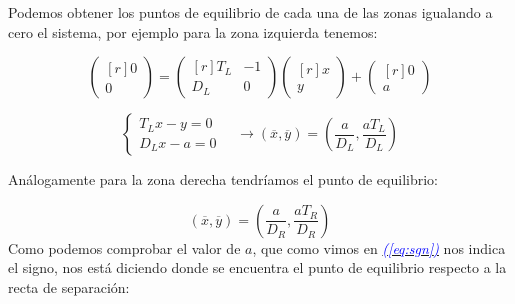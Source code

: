 \documentclass[12pt,a4paper]{report} %
\newcommand{\eref}[1]{\hyperref[#1]{\textcolor{blue}{\textit{(\ref*{#1})}}}}
\begin{document}
		\vspace{0.5cm}Podemos obtener los puntos de equilibrio de cada una de las zonas igualando a cero el sistema, por ejemplo para la zona izquierda tenemos:
		\label{borrar}
		
		\begin{equation*}
			\begin{pmatrix*}[r]
				0\\ 0
			\end{pmatrix*}= \begin{pmatrix*}[r]
				T_L & -1 \\ D_L & 0
			\end{pmatrix*} \begin{pmatrix*}[r]
				x \\ y
			\end{pmatrix*}+\begin{pmatrix*}[r]
				0 \\ a
			\end{pmatrix*}
		\end{equation*}\smallskip
		
		\begin{equation}
			\label{eq:eqpointL}
			\left\{
			\begin{aligned}
				T_Lx-y=0\\
				D_Lx-a=0
			\end{aligned}
			\right. \quad \longrightarrow \left( \overline{x},\overline{y} \right)=\left( \frac{a}{D_L},\frac{aT_L}{D_L} \right)
		\end{equation}\smallskip
		
		Análogamente para la zona derecha tendríamos el punto de equilibrio:
		
		\begin{equation}
			\label{eq:eqpointR}
			\left( \overline{x},\overline{y} \right)=\left( \frac{a}{D_R},\frac{aT_R}{D_R} \right)
		\end{equation}\smallskip
		\newpage
		Como podemos comprobar el valor de $a$, que como vimos en \eref{eq:sgn} nos indica el signo, nos está diciendo donde se encuentra el punto de equilibrio respecto a la recta de separación:
		
\end{document}
